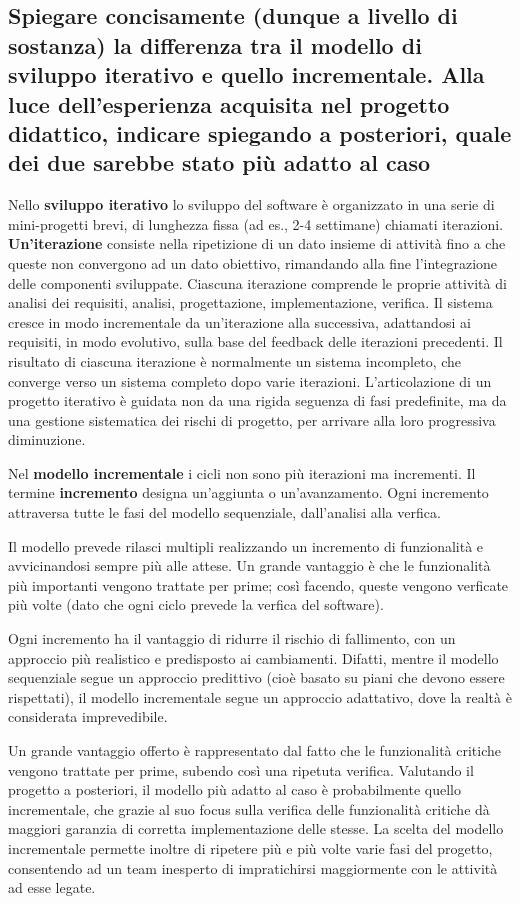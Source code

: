 \subsection{Spiegare concisamente (dunque a livello di sostanza) la differenza tra il modello di sviluppo iterativo e quello incrementale. Alla luce dell'esperienza acquisita nel progetto didattico, indicare spiegando a posteriori, quale dei due sarebbe stato più adatto al caso}

Nello \textbf{sviluppo iterativo} lo sviluppo del software è organizzato in una serie di mini-progetti brevi, di lunghezza fissa (ad es., 2-4 settimane) chiamati iterazioni. \textbf{Un'iterazione} consiste nella ripetizione di un dato insieme di attività fino a che queste non convergono ad un dato obiettivo, rimandando alla fine l’integrazione delle componenti sviluppate. Ciascuna iterazione comprende le proprie attività di analisi dei requisiti, analisi, progettazione, implementazione, verifica.  Il sistema cresce in modo incrementale da un'iterazione alla successiva, adattandosi ai requisiti, in modo evolutivo, sulla base del feedback delle iterazioni precedenti. Il risultato di ciascuna iterazione è normalmente un sistema incompleto, che converge verso un sistema completo dopo varie iterazioni.
L'articolazione di un progetto iterativo è guidata non da una rigida seguenza di fasi predefinite, ma da una gestione sistematica dei rischi di progetto, per arrivare alla loro progressiva diminuzione.


Nel \textbf{modello incrementale} i cicli non sono più iterazioni ma incrementi. Il termine \textbf{incremento} designa un'aggiunta o un'avanzamento. Ogni incremento attraversa tutte le fasi del modello sequenziale, dall'analisi alla verfica.

Il modello prevede rilasci multipli realizzando un incremento di funzionalità e avvicinandosi sempre più alle attese. Un grande vantaggio è che le funzionalità più importanti vengono trattate per prime; così facendo, queste vengono verficate più volte (dato che ogni ciclo prevede la verfica del software). 

Ogni incremento ha il vantaggio di ridurre il rischio di fallimento, con un approccio più realistico e predisposto ai cambiamenti. Difatti, mentre il modello sequenziale segue un approccio predittivo (cioè basato su piani che devono essere rispettati), il modello incrementale segue un approccio adattativo, dove la realtà è considerata imprevedibile. 

Un grande vantaggio offerto è rappresentato dal fatto che le funzionalità critiche vengono trattate per prime, subendo così una ripetuta verifica.
Valutando il progetto a posteriori, il modello più adatto al caso è probabilmente quello incrementale, che grazie al suo focus sulla verifica delle funzionalità critiche dà maggiori garanzia di corretta implementazione delle stesse. La scelta del modello incrementale permette inoltre di ripetere più e più volte varie fasi del progetto, consentendo ad un team inesperto di impratichirsi maggiormente con le attività ad esse legate.